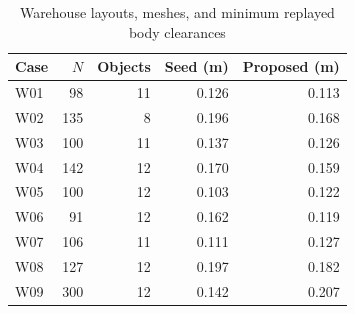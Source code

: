 \begin{table}[!t]
\centering\caption{Warehouse layouts, meshes, and minimum replayed body clearances}
\label{tab:cases}
\footnotesize\begin{tabular}{lrrrr}
\toprule
Case & $N$ & Objects & Seed (m) & Proposed (m)\\
\midrule
W01 & 98 & 11 & 0.126 & 0.113\\
W02 & 135 & 8 & 0.196 & 0.168\\
W03 & 100 & 11 & 0.137 & 0.126\\
W04 & 142 & 12 & 0.170 & 0.159\\
W05 & 100 & 12 & 0.103 & 0.122\\
W06 & 91 & 12 & 0.162 & 0.119\\
W07 & 106 & 11 & 0.111 & 0.127\\
W08 & 127 & 12 & 0.197 & 0.182\\
W09 & 300 & 12 & 0.142 & 0.207\\
\bottomrule\end{tabular}
\end{table}
